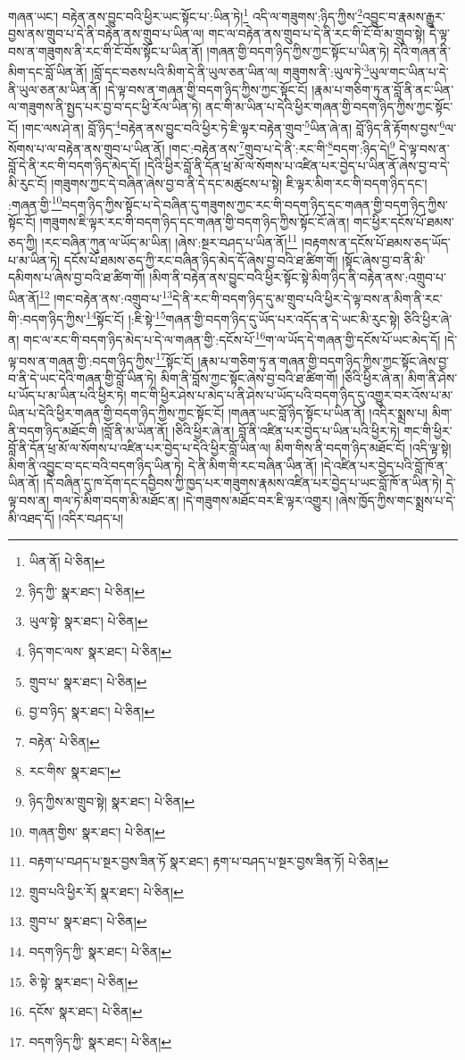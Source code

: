 གཞན་ཡང་། བརྟེན་ནས་བྱུང་བའི་ཕྱིར་ཡང་སྟོང་པ་:ཡིན་ཏེ།\footnote{ཡིན་ནོ།  པེ་ཅིན། } འདི་ལ་གཟུགས་:ཉིད་ཀྱིས་\footnote{ཉིད་ཀྱི་  སྣར་ཐང་།  པེ་ཅིན། }འབྱུང་བ་རྣམས་རྒྱུར་བྱས་ནས་གྲུབ་པ་དེ་ནི་བརྟེན་ནས་གྲུབ་པ་ཡིན་ལ། གང་ལ་བརྟེན་ནས་གྲུབ་པ་དེ་ནི་རང་གི་ངོ་བོ་མ་གྲུབ་སྟེ། དེ་ལྟ་བས་ན་གཟུགས་ནི་རང་གི་ངོ་བོས་སྟོང་པ་ཡིན་ནོ། །གཞན་གྱི་བདག་ཉིད་ཀྱིས་ཀྱང་སྟོང་པ་ཡིན་ཏེ། དེའི་གཞན་ནི་མིག་དང་བློ་ཡིན་ནོ། །བློ་དང་བཅས་པའི་མིག་དེ་ནི་ཡུལ་ཅན་ཡིན་ལ། གཟུགས་ནི་:ཡུལ་ཏེ་\footnote{ཡུལ་སྟེ་  སྣར་ཐང་།  པེ་ཅིན། }ཡུལ་གང་ཡིན་པ་དེ་ནི་ཡུལ་ཅན་མ་ཡིན་ནོ། །དེ་ལྟ་བས་ན་གཞན་གྱི་བདག་ཉིད་ཀྱིས་ཀྱང་སྟོང་ངོ། །རྣམ་པ་གཅིག་ཏུ་ན་བློ་ནི་ནང་ཡིན་ལ་གཟུགས་ནི་སྤྱད་པར་བྱ་བ་དང་ཕྱི་རོལ་ཡིན་ཏེ། ནང་གི་མ་ཡིན་པ་དེའི་ཕྱིར་གཞན་གྱི་བདག་ཉིད་ཀྱིས་ཀྱང་སྟོང་ངོ། །གང་ལས་ཤེ་ན། བློ་ཉིད་\footnote{ཉིད་གང་ལས་  སྣར་ཐང་།  པེ་ཅིན། }བརྟེན་ནས་བྱུང་བའི་ཕྱིར་ཏེ་ཇི་ལྟར་བརྟེན་གྲུབ་\footnote{གྲུབ་པ་  སྣར་ཐང་།  པེ་ཅིན། }ཡིན་ཞེ་ན། བློ་ཉིད་ནི་རྟོགས་བྱས་\footnote{བྱ་བ་ཉིད་  སྣར་ཐང་།  པེ་ཅིན། }ལ་སོགས་པ་ལ་བརྟེན་ནས་གྲུབ་པ་ཡིན་ནོ། །གང་:བརྟེན་ནས་\footnote{བརྟེན་  པེ་ཅིན། }གྲུབ་པ་དེ་ནི་:རང་གི་\footnote{རང་གིས་  སྣར་ཐང་། }བདག་:ཉིད་དེ།\footnote{ཉིད་ཀྱིས་མ་གྲུབ་སྟེ།  སྣར་ཐང་།  པེ་ཅིན། } དེ་ལྟ་བས་ན་བློ་དེ་ནི་རང་གི་བདག་ཉིད་མེད་དོ། །དེའི་ཕྱིར་བློ་ནི་དོན་ཕྲ་མོ་ལ་སོགས་པ་འཛིན་པར་བྱེད་པ་ཡིན་ནོ་ཞེས་བྱ་བ་དེ་མི་རུང་ངོ། །གཟུགས་ཀྱང་དེ་བཞིན་ཞེས་བྱ་བ་ནི་དེ་དང་མཚུངས་པ་སྟེ། ཇི་ལྟར་མིག་རང་གི་བདག་ཉིད་དང་། :གཞན་གྱི་\footnote{གཞན་གྱིས་  སྣར་ཐང་།  པེ་ཅིན། }བདག་ཉིད་ཀྱིས་སྟོང་པ་དེ་བཞིན་དུ་གཟུགས་ཀྱང་རང་གི་བདག་ཉིད་དང་གཞན་གྱི་བདག་ཉིད་ཀྱིས་སྟོང་ངོ། །གཟུགས་ཇི་ལྟར་རང་གི་བདག་ཉིད་དང་གཞན་གྱི་བདག་ཉིད་ཀྱིས་སྟོང་ངོ་ཞེ་ན། གང་ཕྱིར་དངོས་པོ་ཐམས་ཅད་ཀྱི། །རང་བཞིན་ཀུན་ལ་ཡོད་མ་ཡིན། །ཞེས་:སྔར་བཤད་པ་ཡིན་ནོ།\footnote{བརྟག་པ་བཤད་པ་སྔར་བྱས་ཟིན་ཏོ  སྣར་ཐང་། རྟག་པ་བཤད་པ་སྔར་བྱས་ཟིན་ཏོ།  པེ་ཅིན། } །བརྟགས་ན་དངོས་པོ་ཐམས་ཅད་ཡོད་པ་མ་ཡིན་ཏེ། དངོས་པོ་ཐམས་ཅད་ཀྱི་རང་བཞིན་ཉིད་མེད་དོ་ཞེས་བྱ་བའི་ཐ་ཚིག་གོ། །སྟོང་ཞེས་བྱ་བ་ནི་མི་དམིགས་པ་ཞེས་བྱ་བའི་ཐ་ཚིག་གོ། །མིག་ནི་བརྟེན་ནས་བྱུང་བའི་ཕྱིར་སྟོང་སྟེ་མིག་ཉིད་ནི་བརྟེན་ནས་:འགྲུབ་པ་ཡིན་ནོ།\footnote{གྲུབ་པའི་ཕྱིར་རོ།  སྣར་ཐང་།  པེ་ཅིན། } །གང་བརྟེན་ནས་:འགྲུབ་པ་\footnote{གྲུབ་པ་  སྣར་ཐང་།  པེ་ཅིན། }དེ་ནི་རང་གི་བདག་ཉིད་དུ་མ་གྲུབ་པའི་ཕྱིར་དེ་ལྟ་བས་ན་མིག་ནི་རང་གི་:བདག་ཉིད་ཀྱིས་\footnote{བདག་ཉིད་ཀྱི་  སྣར་ཐང་།  པེ་ཅིན། }སྟོང་ངོ། །:ཇི་སྟེ་\footnote{ཅི་སྟེ་  སྣར་ཐང་།  པེ་ཅིན། }གཞན་གྱི་བདག་ཉིད་དུ་ཡོད་པར་འདོད་ན་དེ་ཡང་མི་རུང་སྟེ། ཅིའི་ཕྱིར་ཞེ་ན། གང་ལ་རང་གི་བདག་ཉིད་མེད་པ་དེ་ལ་གཞན་གྱི་:དངོས་པོ་\footnote{དངོས་  སྣར་ཐང་།  པེ་ཅིན། }ག་ལ་ཡོད་དེ་གཞན་གྱི་དངོས་པོ་ཡང་མེད་དོ། །དེ་ལྟ་བས་ན་གཞན་གྱི་:བདག་ཉིད་ཀྱིས་\footnote{བདག་ཉིད་ཀྱི་  སྣར་ཐང་།  པེ་ཅིན། }སྟོང་ངོ། །རྣམ་པ་གཅིག་ཏུ་ན་གཞན་གྱི་བདག་ཉིད་ཀྱིས་ཀྱང་སྟོང་ཞེས་བྱ་བ་ནི་དེ་ཡང་དེའི་གཞན་གྱི་བློ་ཡིན་ཏེ། མིག་ནི་བློས་ཀྱང་སྟོང་ཞེས་བྱ་བའི་ཐ་ཚིག་གོ། །ཅིའི་ཕྱིར་ཞེ་ན། མིག་ནི་ཤེས་པ་ཡོད་པ་མ་ཡིན་པའི་ཕྱིར་ཏེ། གང་གི་ཕྱིར་ཤེས་པ་མེད་པ་ནི་ཤེས་པ་ཡོད་པའི་བདག་ཉིད་དུ་འགྱུར་བར་འོས་པ་མ་ཡིན་པ་དེའི་ཕྱིར་གཞན་གྱི་བདག་ཉིད་ཀྱིས་ཀྱང་སྟོང་ངོ། །གཞན་ཡང་བློ་ཉིད་སྟོང་པ་ཡིན་ནོ། །འདིར་སྨྲས་པ། མིག་ནི་བདག་ཉིད་མཐོང་གི །བློ་ནི་མ་ཡིན་ནོ། །ཅིའི་ཕྱིར་ཞེ་ན། བློ་ནི་འཛིན་པར་བྱེད་པ་ཡིན་པའི་ཕྱིར་ཏེ། གང་གི་ཕྱིར་བློ་ནི་དོན་ཕྲ་མོ་ལ་སོགས་པ་འཛིན་པར་བྱེད་པ་དེའི་ཕྱིར་བློ་ཡིན་ལ། མིག་གིས་ནི་བདག་ཉིད་མཐོང་ངོ། །འདི་ལྟ་སྟེ། མིག་ནི་འབྱུང་བ་དང་བའི་བདག་ཉིད་ཡིན་ཏེ། དེ་ནི་མིག་གི་རང་བཞིན་ཡིན་ནོ། །དེ་འཛིན་པར་བྱེད་པའི་བློ་ཁོ་ན་ཡིན་ནོ། །དེ་བཞིན་དུ་ཁ་དོག་དང་དབྱིབས་ཀྱི་ཁྱད་པར་གཟུགས་རྣམས་འཛིན་པར་བྱེད་པ་ཡང་བློ་ཁོ་ན་ཡིན་ཏེ། དེ་ལྟ་བས་ན། གལ་ཏེ་མིག་བདག་མི་མཐོང་ན། །དེ་གཟུགས་མཐོང་བར་ཇི་ལྟར་འགྱུར། །ཞེས་ཁྱོད་ཀྱིས་གང་སྨྲས་པ་དེ་མི་འཐད་དོ། །འདིར་བཤད་པ། 